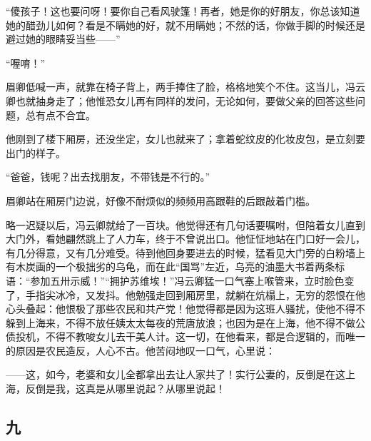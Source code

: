\par “傻孩子！这也要问呀！要你自己看风驶篷！再者，她是你的好朋友，你总该知道她的醋劲儿如何？看是不瞒她的好，就不用瞒她；不然的话，你做手脚的时候还是避过她的眼睛妥当些——”
\par “喔唷！”
\par 眉卿低喊一声，就靠在椅子背上，两手捧住了脸，格格地笑个不住。这当儿，冯云卿也就抽身走了；他惟恐女儿再有同样的发问，无论如何，要做父亲的回答这些问题，总有点不合宜。
\par 他刚到了楼下厢房，还没坐定，女儿也就来了；拿着蛇纹皮的化妆皮包，是立刻要出门的样子。
\par “爸爸，钱呢？出去找朋友，不带钱是不行的。”
\par 眉卿站在厢房门边说，好像不耐烦似的频频用高跟鞋的后跟敲着门槛。
\par 略一迟疑以后，冯云卿就给了一百块。他觉得还有几句话要嘱咐，但陪着女儿直到大门外，看她翩然跳上了人力车，终于不曾说出口。他怔怔地站在门口好一会儿，有几分得意，又有几分难受。待到他回身要进去的时候，猛看见大门旁的白粉墙上有木炭画的一个极拙劣的乌龟，而在此“国骂”左近，乌亮的油墨大书着两条标语：“参加五卅示威！”“拥护苏维埃！”冯云卿猛一口气塞上喉管来，立时脸色变了，手指尖冰冷，又发抖。他勉强走回到厢房里，就躺在炕榻上，无穷的怨恨在他心头叠起：他恨极了那些农民和共产党！他觉得都是因为这班人骚扰，使他不得不躲到上海来，不得不放任姨太太每夜的荒唐放浪；也因为是在上海，他不得不做公债投机，不得不教唆女儿去干美人计。这一切，在他看来，都是合逻辑的，而唯一的原因是农民造反，人心不古。他苦闷地叹一口气，心里说：
\par ——这，如今，老婆和女儿全都拿出去让人家共了！实行公妻的，反倒是在这上海，反倒是我，这真是从哪里说起？从哪里说起！




\subsection*{九}

